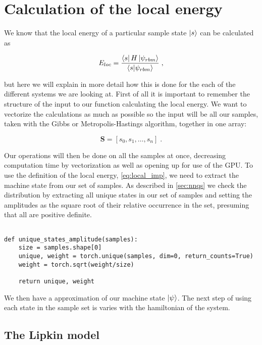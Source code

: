 \section{Calculation of the local energy}

We know that the local energy of a particular sample state $\ket{s}$ can be calculated as

\begin{equation}
  E_{loc} = \displaystyle\frac{\bra{s}H\ket{\psi_{rbm}}}{\braket{s}{\psi_{rbm}}} \; ,
  \label{eq:local_imp}
\end{equation}

but here we will explain in more detail how this is done for the each of the different systems we are looking at. First of all it is important to remember the structure of the input to our function calculating the local energy. We want to vectorize the calculations as much as possible so the input will be all our samples, taken with the Gibbs or Metropolis-Hastings algorithm, together in one array:

\begin{equation}
  \mathbf{S} = \left [ s_0, s_1, \dots, s_n \right] \; .
  \label{eq:Samples_set}
\end{equation}

Our operations will then be done on all the samples at once, decreasing computation time by vectorization as well as opening up for use of the GPU. To use the definition of the local energy, \ref{eq:local_imp}, we need to extract the machine state from our set of samples. As described in \ref{sec:nnqs} we check the distribution by extracting all unique states in our set of samples and setting the amplitudes as the square root of their relative occurrence in the set, presuming that all are positive definite.

\begin{verbatim}
  
def unique_states_amplitude(samples):
    size = samples.shape[0]
    unique, weight = torch.unique(samples, dim=0, return_counts=True)
    weight = torch.sqrt(weight/size)

    return unique, weight
\end{verbatim}

We then have a approximation of our machine state $\ket{\psi}$. The next step of using each state in the sample set is varies with the hamiltonian of the system.

\subsection{The Lipkin model}

